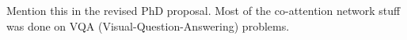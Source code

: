 \documentclass{article}%
\begin{document}
\newline%
\newline%
%
Mention this in the revised PhD proposal. Most of the co{-}attention network stuff was done on VQA (Visual{-}Question{-}Answering) problems. %
\newline%
\newline%
%
%
\newline%
\newline%
%
%
\newline%
\newline%
%
%
\newline%
\newline%
%
%
\newline%
\newline%
%
%
\newline%
\newline%
%
%
\newline%
\newline%
%
%
\newline%
\newline%
%
%
\newline%
\newline%
%
%
\newline%
\newline%
%
%
\newline%
\newline%
%
%
\newline%
\newline%
%
%
\newline%
\newline%
%
%
\newline%
\newline%
%
%
\newline%
\newline%
%
%
\newline%
\newline%
%
%
\newline%
\newline%
%
%
\newline%
\newline%
%
%
\newline%
\newline%
%
%
\newline%
\newline%
%
%
\newline%
\newline%
%
%
\newline%
\newline%
%
%
\newline%
\newline%
\end{document}
